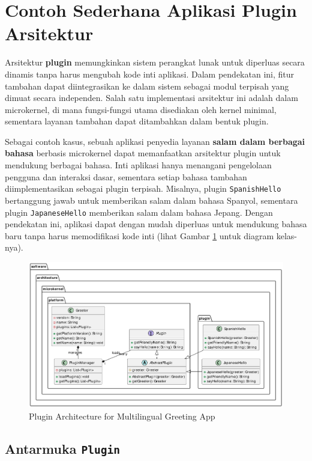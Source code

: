 \section{Contoh Sederhana Aplikasi Plugin Arsitektur}

Arsitektur \textbf{plugin} memungkinkan sistem perangkat lunak untuk diperluas secara dinamis tanpa harus mengubah kode inti aplikasi. Dalam pendekatan ini, fitur tambahan dapat diintegrasikan ke dalam sistem sebagai modul terpisah yang dimuat secara independen. Salah satu implementasi arsitektur ini adalah dalam microkernel, di mana fungsi-fungsi utama disediakan oleh kernel minimal, sementara layanan tambahan dapat ditambahkan dalam bentuk plugin.

Sebagai contoh kasus, sebuah aplikasi penyedia layanan \textbf{salam dalam berbagai bahasa} berbasis microkernel dapat memanfaatkan arsitektur plugin untuk mendukung berbagai bahasa. Inti aplikasi hanya menangani pengelolaan pengguna dan interaksi dasar, sementara setiap bahasa tambahan diimplementasikan sebagai plugin terpisah. Misalnya, plugin \texttt{SpanishHello} bertanggung jawab untuk memberikan salam dalam bahasa Spanyol, sementara plugin \texttt{JapaneseHello} memberikan salam dalam bahasa Jepang. Dengan pendekatan ini, aplikasi dapat dengan mudah diperluas untuk mendukung bahasa baru tanpa harus memodifikasi kode inti (lihat Gambar \ref{fig:plugin_architecture} untuk diagram kelas-nya).

\begin{figure}
	\centering
	\includegraphics[width=\textwidth]{../images/out/plugin_architecture}
	\caption{Plugin Architecture for Multilingual Greeting App}
	\label{fig:plugin_architecture}
\end{figure}


\subsection{Antarmuka \texttt{Plugin}}


